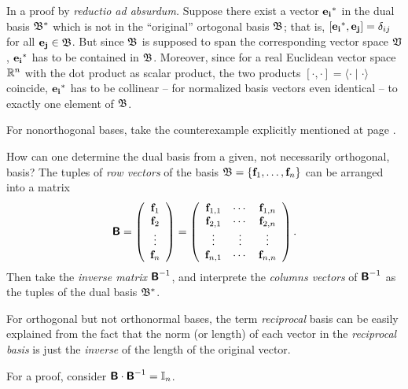 {\color{OliveGreen}
\bproof

In a proof by {\it reductio ad absurdum.}
Suppose there exist a vector ${\bf e_i}^*$ in the dual basis  ${\frak B}^*$
which is not in  the ``original'' ortogonal basis ${\frak B}$;
that is, $[{\bf e_i}^*,{\bf e_j}]=\delta_{ij}$ for all ${\bf e_j} \in {\frak B}$.
But since ${\frak B}$ is supposed to span the corresponding vector space ${\frak V}$,
${\bf e_i}^*$ has to be contained in ${\frak B}$.
Moreover, since for  a real Euclidean vector space ${\Bbb R}^n$
with the dot product as scalar product, the two products
$[\cdot , \cdot ]=\langle \cdot \mid \cdot \rangle$
coincide, ${\bf e_i}^*$ has to be collinear
-- for normalized basis vectors even identical -- to exactly one element of ${\frak B}$.

For nonorthogonal bases, take the counterexample explicitly mentioned at page \pageref{2011-m-cenobdb}.
\eproof
}

How can one determine the dual basis from a given,
not necessarily orthogonal, basis?
The tuples of {\em row vectors} of the basis ${\frak B} = \{{\bf f}_1,\ldots , {\bf f}_n\}$
can be arranged into a matrix
\begin{equation}
\textsf{\textbf{B}}
=
\left(
\begin{array}{cccccccccc}
{\bf f}_{1}\\
{\bf f}_{2}\\
\vdots  \\
{\bf f}_{n}
\end{array}
\right)  =
\left(
\begin{array}{cccccccccc}
{\bf f}_{1,1}&\cdots & {\bf f}_{1,n}\\
{\bf f}_{2,1}&\cdots & {\bf f}_{2,n}\\
\vdots&\vdots & \vdots \\
{\bf f}_{n,1}&\cdots & {\bf f}_{n,n}
\end{array}
\right).
\end{equation}
Then take the
{\em inverse matrix}
$\textsf{\textbf{B}}^{-1}$,
and interprete the
{\em columns vectors} of $\textsf{\textbf{B}}^{-1}$
as the tuples of the dual basis  ${\frak B}^*$.

For orthogonal but not orthonormal bases, the term {\em reciprocal} basis
can be easily explained from the fact that the norm (or length) of each vector in the {\em reciprocal basis}
is just the {\em inverse} of the length of the original vector.

{\color{OliveGreen}
\bproof
For a proof, consider $\textsf{\textbf{B}}\cdot \textsf{\textbf{B}}^{-1} ={\Bbb I}_n$.
\eproof
}



